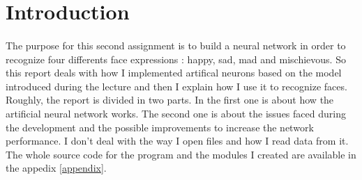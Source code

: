 \section*{Introduction}

    \paragraph{}{
        The purpose for this second assignment is to build a neural network in
     order to recognize four differents face expressions : happy, sad, mad and 
     mischievous. So this report deals with how I implemented artifical neurons
     based on the model introduced during the lecture and then I explain how I 
     use it to recognize faces. Roughly, the report is divided in two parts. 
     In the first one is about how the artificial neural network works. The
     second one is about the issues faced during the development and the 
     possible improvements to increase the network performance. \newline
     I don't deal with the way I open files and how I read data from it. The 
     whole source code for the program and the modules I created are available 
     in the appedix \ref{appendix}.
    }

